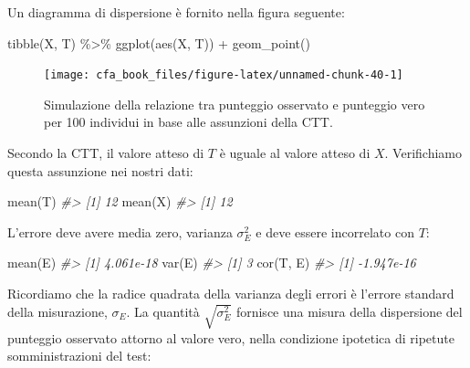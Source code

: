 \documentclass[
  11pt,
]{krantz}
\makeatletter
\newenvironment{Shaded}{\begin{snugshade}}{\end{snugshade}}
\newcommand{\CommentTok}[1]{\textcolor[rgb]{0.37,0.37,0.37}{\textit{#1}}}
\newcommand{\FunctionTok}[1]{\textcolor[rgb]{0,0,0}{#1}}
\newcommand{\NormalTok}[1]{#1}
\newcommand{\SpecialCharTok}[1]{\textcolor[rgb]{0,0,0}{#1}}
\newenvironment{kframe}{%
\medskip{}
\setlength{\fboxsep}{.8em}
 \def\at@end@of@kframe{}%
 \ifinner\ifhmode%
  \def\at@end@of@kframe{\end{minipage}}%
  \begin{minipage}{\columnwidth}%
 \fi\fi%
 \def\FrameCommand##1{\hskip\@totalleftmargin \hskip-\fboxsep
 \colorbox{shadecolor}{##1}\hskip-\fboxsep
     \hskip-\linewidth \hskip-\@totalleftmargin \hskip\columnwidth}%
 \MakeFramed {\advance\hsize-\width
   \@totalleftmargin\z@ \linewidth\hsize
   \@setminipage}}%
 {\par\unskip\endMakeFramed%
 \at@end@of@kframe}
\renewenvironment{Shaded}{\begin{kframe}}{\end{kframe}}
\theoremstyle{definition}
\theoremstyle{definition}
\theoremstyle{definition}
\theoremstyle{definition}
\theoremstyle{remark}
\makeatother
\begin{document}
Un diagramma di dispersione è fornito nella figura seguente:

\begin{Shaded}
\begin{Highlighting}[]
\FunctionTok{tibble}\NormalTok{(X, T) }\SpecialCharTok{\%\textgreater{}\%}
  \FunctionTok{ggplot}\NormalTok{(}\FunctionTok{aes}\NormalTok{(X, T)) }\SpecialCharTok{+}
  \FunctionTok{geom\_point}\NormalTok{()}
\end{Highlighting}
\end{Shaded}

\begin{figure}

{\centering \texttt{[image: cfa\_book\_files/figure-latex/unnamed-chunk-40-1]} 

}

\caption{Simulazione della relazione tra punteggio osservato e punteggio vero per 100 individui in base alle assunzioni della CTT.}\label{fig:unnamed-chunk-40}
\end{figure}

Secondo la CTT, il valore atteso di \(T\) è uguale al valore atteso di \(X\). Verifichiamo questa assunzione nei nostri dati:

\begin{Shaded}
\begin{Highlighting}[]
\FunctionTok{mean}\NormalTok{(T)}
\CommentTok{\#\textgreater{} [1] 12}
\FunctionTok{mean}\NormalTok{(X)}
\CommentTok{\#\textgreater{} [1] 12}
\end{Highlighting}
\end{Shaded}

L'errore deve avere media zero, varianza \(\sigma_E^2\) e deve essere incorrelato con \(T\):

\begin{Shaded}
\begin{Highlighting}[]
\FunctionTok{mean}\NormalTok{(E)}
\CommentTok{\#\textgreater{} [1] 4.061e{-}18}
\FunctionTok{var}\NormalTok{(E)}
\CommentTok{\#\textgreater{} [1] 3}
\FunctionTok{cor}\NormalTok{(T, E)}
\CommentTok{\#\textgreater{} [1] {-}1.947e{-}16}
\end{Highlighting}
\end{Shaded}

Ricordiamo che la radice quadrata della varianza degli errori è l'errore standard della misurazione, \(\sigma_E\). La quantità \(\sqrt{\sigma_E^2}\) fornisce una misura della dispersione del punteggio osservato attorno al valore vero, nella condizione ipotetica di ripetute somministrazioni del test:
\end{document}
